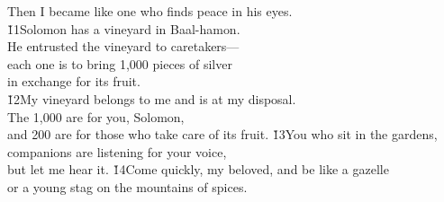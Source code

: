 \begin{poetry}
\poemll    Then I became like one who finds peace in his eyes. \\
\poeml \v{11}Solomon has a vineyard in Baal-hamon. \\
\poemll    He entrusted the vineyard to caretakers--- \\
\poeml each one is to bring 1,000 pieces of silver \\
\poemll    in exchange for its fruit. \\
\poeml \v{12}My vineyard belongs to me and is at my disposal. \\
\poemll    The 1,000 are for you, Solomon, \\
\poemlll       and 200 are for those who take care of its fruit.
\poeml \v{13}You who sit in the gardens, \\
\poemll    companions are listening for your voice, \\
\poemlll       but let me hear it.
\poeml \v{14}Come quickly, my beloved, and be like a gazelle \\
\poemll    or a young stag on the mountains of spices.\end{poetry}
